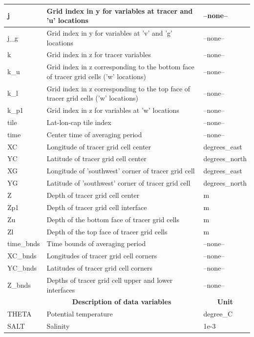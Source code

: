 \begin{longtable}{|m{}|m{}|m{}|}
j &Grid index in y for variables at tracer and 'u' locations &--none--  \\ \hline
j\_g &Grid index in y for variables at 'v' and 'g' locations &--none--  \\ \hline
k &Grid index in z for tracer variables &--none--  \\ \hline
k\_u &Grid index in z corresponding to the bottom face of tracer grid cells ('w' locations) &--none--  \\ \hline
k\_l &Grid index in z corresponding to the top face of tracer grid cells ('w' locations) &--none--  \\ \hline
k\_p1 &Grid index in z for variables at 'w' locations &--none--  \\ \hline
tile &Lat-lon-cap tile index &--none--  \\ \hline
time &Center time of averaging period &--none--  \\ \hline
XC &Longitude of tracer grid cell center &degrees\_east  \\ \hline
YC &Latitude of tracer grid cell center &degrees\_north  \\ \hline
XG &Longitude of 'southwest' corner of tracer grid cell &degrees\_east  \\ \hline
YG &Latitude of 'southwest' corner of tracer grid cell &degrees\_north  \\ \hline
Z &Depth of tracer grid cell center &m  \\ \hline
Zp1 &Depth of tracer grid cell interface &m  \\ \hline
Zu &Depth of the bottom face of tracer grid cells &m  \\ \hline
Zl &Depth of the top face of tracer grid cells &m  \\ \hline
time\_bnds &Time bounds of averaging period &--none--  \\ \hline
XC\_bnds &Longitudes of tracer grid cell corners &--none--  \\ \hline
YC\_bnds &Latitudes of tracer grid cell corners &--none--  \\ \hline
Z\_bnds &Depths of tracer grid cell upper and lower interfaces &--none--  \\ \hline
\rowcolor{lightgray} \multicolumn{1}{|c|}{\textbf{Variables}} & \multicolumn{1}{|c|}{\textbf{Description of data variables}} &  \multicolumn{1}{|c|}{\textbf{Unit}}\\ \hline
THETA &Potential temperature  &degree\_C  \\ \hline
SALT &Salinity &1e-3  \\ \hline
\end{longtable}

